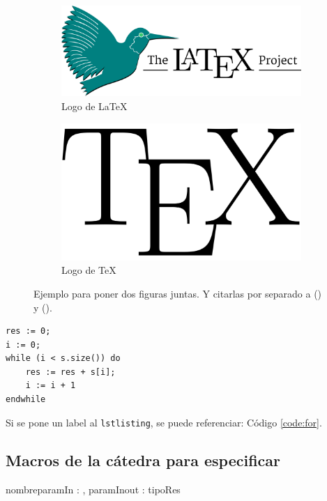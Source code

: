 \documentclass[10pt,a4paper]{article}
\begin{document}
\begin{figure}[ht!]
	\begin{subfigure}{0.5\textwidth}
		\includegraphics[width=0.5\linewidth]{LaTeX-project} 
		\caption{Logo de LaTeX}
		\label{fig:subfig1}
	\end{subfigure}
	\begin{subfigure}{0.8\textwidth}
		\includegraphics[width=0.2\linewidth]{TeX}
		\caption{Logo de TeX}
		\label{fig:subfig2}
	\end{subfigure}
	\caption{Ejemplo para poner dos figuras juntas. Y citarlas por separado a () y ().}
	\label{fig:subfigs}
\end{figure}



	\begin{lstlisting}[caption={Ejemplo de código (usando los estilos de la cátedra, ver las macros para más detalles)},label=code:for]
res := 0;
i := 0;
while (i < s.size()) do
	res := res + s[i];
	i := i + 1
endwhile
	\end{lstlisting}

Si se pone un label al \verb|lstlisting|, se puede referenciar: Código \ref{code:for}.


\subsection{Macros de la cátedra para especificar}

\begin{proc}{nombre}{\In paramIn : \nat, \Inout paramInout : \TLista{\ent}}{tipoRes}
\end{proc}

\end{document}
